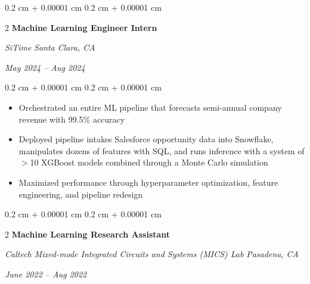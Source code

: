 \documentclass[10pt, letterpaper]{article}
\newenvironment{highlights}{ \begin{itemize}[ topsep=0.10 cm, parsep=0.10 cm, partopsep=0pt,
itemsep=0pt, leftmargin=0.4 cm + 10pt ] }{ \end{itemize} } %
\newenvironment{onecolentry}{ \begin{adjustwidth}{ 0.2 cm + 0.00001 cm }{ 0.2 cm + 0.00001 cm }
}{ \end{adjustwidth} } %
\newenvironment{twocolentry}[2][]{ \onecolentry \def\secondColumn{#2} \setcolumnwidth{\fill, 4.5 cm}
\begin{paracol}{2} }{ \switchcolumn \raggedleft \secondColumn \end{paracol}
\endonecolentry } %
\begin{document}
	\vspace{0.2 cm}

	\begin{twocolentry}
		{ \textit{Santa Clara, CA}

		\textit{May 2024 – Aug 2024}} \textbf{Machine Learning Engineer Intern}

		\textit{SiTime}
	\end{twocolentry}

	\vspace{0.10 cm}
	\begin{onecolentry}
		\begin{highlights}
			\item Orchestrated an entire ML pipeline that forecasts semi-annual company revenue with 99.5\% accuracy \item Deployed pipeline intakes
			Salesforce opportunity data into Snowflake, manipulates dozens of features with SQL, and
			runs inference with a system of $>$10 XGBoost models combined through a
			Monte Carlo simulation \item Maximized performance through hyperparameter
			optimization, feature engineering, and pipeline redesign
		\end{highlights}
	\end{onecolentry}

	\vspace{0.2 cm}

%
%
%
%

	\begin{twocolentry}
		{ \textit{Pasadena, CA}

		\textit{June 2022 – Aug 2022}} \textbf{Machine Learning Research Assistant}

		\textit{Caltech Mixed-mode Integrated Circuits and Systems (MICS) Lab}
	\end{twocolentry}
\end{document}
